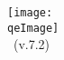 \begin{center}
\def\version{7.2}
\def\qeImage{../../Doc/quantum_espresso}


  \texttt{[image: \\qeImage]} \\
  
	       \vspace{5.5cm}
  \Huge \intitle\ (v.\version) 
\end{center}
